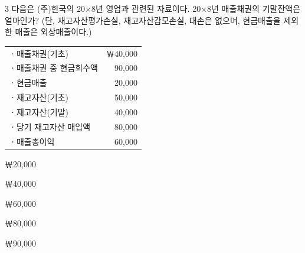 \begin{question}{3}
다음은 (주)한국의 20×8년 영업과 관련된 자료이다. 20×8년 매출채권의 기말잔액은 얼마인가? (단, 재고자산평가손실, 재고자산감모손실, 대손은 없으며, 현금매출을 제외한 매출은 외상매출이다.)

{\small\centering
\begin{tabular}{@{}l r@{}}
\hline
ㆍ매출채권(기초) & ￦40,000 \\
ㆍ매출채권 중 현금회수액 & 90,000 \\
ㆍ현금매출 & 20,000 \\
ㆍ재고자산(기초) & 50,000 \\
ㆍ재고자산(기말) & 40,000 \\
ㆍ당기 재고자산 매입액 & 80,000 \\
ㆍ매출총이익 & 60,000 \\
\hline
\end{tabular}\par}
\begin{choices}
  \item ￦20,000
  \item ￦40,000
  \item ￦60,000
  \item ￦80,000
  \item ￦90,000
\end{choices}
\end{question}
